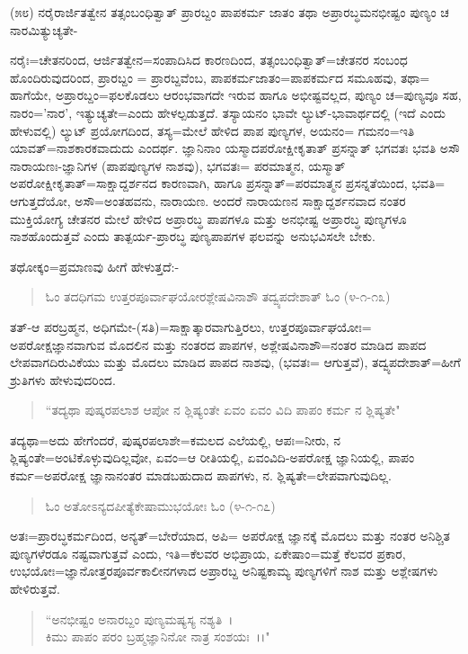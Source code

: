 (೫೮) ನರೈರಾರ್ಜಿತತ್ವೇನ ತತ್ಸಂಬಂಧಿತ್ವಾತ್ ಪ್ರಾರಬ್ದಂ ಪಾಪಕರ್ಮ ಜಾತಂ ತಥಾ ಅಪ್ರಾರಬ್ಧಮನಭೀಷ್ಟಂ ಪುಣ್ಯಂ ಚ ನಾರಮಿತ್ಯುಚ್ಯತೇ-

ನರೈಃ=ಚೇತನರಿಂದ, ಆರ್ಜಿತತ್ವೇನ=ಸಂಪಾದಿಸಿದ ಕಾರಣದಿಂದ, ತತ್ಸಂಬಂಧಿತ್ವಾತ್=ಚೇತನರ ಸಂಬಂಧ ಹೊಂದಿರುವುದರಿಂದ, ಪ್ರಾರಬ್ದಂ = ಪ್ರಾರಬ್ದವೆಂಬ, ಪಾಪಕರ್ಮಜಾತಂ=ಪಾಪಕರ್ಮದ ಸಮೂಹವು, ತಥಾ= ಹಾಗೆಯೇ, ಅಪ್ರಾರಬ್ದಂ=ಫಲಕೊಡಲು ಆರಂಭವಾಗದೇ ಇರುವ ಹಾಗೂ ಅಭೀಷ್ಟವಲ್ಲದ, ಪುಣ್ಯಂ ಚ=ಪುಣ್ಯವೂ ಸಹ, ನಾರಂ='ನಾರ', ಇತ್ಯುಚ್ಯತೇ=ಎಂದು ಹೇಳಲ್ಪಡುತ್ತದೆ. ತಸ್ಯಾಯನಂ ಭಾವೇ ಲ್ಯುಟ್-ಭಾವಾರ್ಥದಲ್ಲಿ (ಇದೆ ಎಂದು ಹೇಳುವಲ್ಲಿ) ಲ್ಯುಟ್ ಪ್ರಯೋಗದಿಂದ, ತಸ್ಯ=ಮೇಲೆ ಹೇಳಿದ ಪಾಪ ಪುಣ್ಯಗಳ, ಅಯನಂ= ಗಮನಂ=ಇತಿ ಯಾವತ್=ನಾಶಕಾರಕವಾದುದು ಎಂದರ್ಥ. ಜ್ಞಾನಿನಾಂ ಯಸ್ಮಾದಪರೋಕ್ಷೀಕೃತಾತ್ ಪ್ರಸನ್ನಾತ್ ಭಗವತಃ ಭವತಿ ಅಸೌ ನಾರಾಯಣಃ-ಜ್ಞಾನಿಗಳ (ಪಾಪಪುಣ್ಯಗಳ ನಾಶವು), ಭಗವತಃ= ಪರಮಾತ್ಮನ, ಯಸ್ಮಾತ್ ಅಪರೋಕ್ಷೀಕೃತಾತ್=ಸಾಕ್ಷಾದ್ದರ್ಶನದ ಕಾರಣವಾಗಿ, ಹಾಗೂ ಪ್ರಸನ್ನಾತ್=ಪರಮಾತ್ಮನ ಪ್ರಸನ್ನತೆಯಿಂದ, ಭವತಿ= ಆಗುತ್ತದೆಯೋ, ಅಸೌ=ಅಂತಹವನು, ನಾರಾಯಣ. ಅಂದರೆ ನಾರಾಯಣನ ಸಾಕ್ಷಾದ್ದರ್ಶನವಾದ ನಂತರ ಮುಕ್ತಿಯೋಗ್ಯ ಚೇತನರ ಮೇಲೆ ಹೇಳಿದ ಅಪ್ರಾರಬ್ಧ ಪಾಪಗಳೂ ಮತ್ತು ಅನಭೀಷ್ಟ ಅಪ್ರಾರಬ್ಧ ಪುಣ್ಯಗಳೂ ನಾಶಹೊಂದುತ್ತವೆ ಎಂದು ತಾತ್ಪರ್ಯ-ಪ್ರಾರಬ್ಧ ಪುಣ್ಯಪಾಪಗಳ ಫಲವನ್ನು ಅನುಭವಿಸಲೇ ಬೇಕು.

ತಥೋಕ್ಕಂ=ಪ್ರಮಾಣವು ಹೀಗೆ ಹೇಳುತ್ತದೆ:-

\begin{verse}
ಓಂ ತದಧಿಗಮ ಉತ್ತರಪೂರ್ವಾಘಯೋರಶ್ಲೇಷವಿನಾಶೌ‌ ತದ್ವ್ಯಪದೇಶಾತ್ ಓಂ (೪-೧-೧೩)
\end{verse}

ತತ್-ಆ ಪರಬ್ರಹ್ಮನ, ಅಧಿಗಮೇ-(ಸತಿ)=ಸಾಕ್ಷಾತ್ಕಾರವಾಗುತ್ತಿರಲು, ಉತ್ತರಪೂರ್ವಾಘಯೋಃ= ಅಪರೋಕ್ಷಜ್ಞಾನವಾಗುವ ಮೊದಲಿನ ಮತ್ತು ನಂತರದ ಪಾಪಗಳ, ಅಶ್ಲೇಷವಿನಾಶೌ=ನಂತರ ಮಾಡಿದ ಪಾಪದ ಲೇಪವಾಗದಿರುವಿಕೆಯು ಮತ್ತು ಮೊದಲು ಮಾಡಿದ ಪಾಪದ ನಾಶವು, (ಭವತಃ= ಆಗುತ್ತವೆ), ತದ್ವ್ಯಪದೇಶಾತ್=ಹೀಗೆ ಶ್ರುತಿಗಳು ಹೇಳುವುದರಿಂದ.

\begin{verse}
``ತದ್ಯಥಾ ಪುಷ್ಕರಪಲಾಶ ಆಪೋ ನ ಶ್ಲಿಷ್ಯಂತೇ ಏವಂ ಏವಂ ವಿದಿ ಪಾಪಂ ಕರ್ಮ ನ ಶ್ಲಿಷ್ಯತೇ"
\end{verse}

ತದ್ಯಥಾ=ಅದು ಹೇಗೆಂದರೆ, ಪುಷ್ಕರಪಲಾಶೇ=ಕಮಲದ ಎಲೆಯಲ್ಲಿ, ಆಪಃ=ನೀರು, ನ ಶ್ಲಿಷ್ಯಂತೇ=ಅಂಟಿಕೊಳ್ಳುವುದಿಲ್ಲವೋ, ಏವಂ=ಆ ರೀತಿಯಲ್ಲಿ, ಏವಂವಿದಿ-ಅಪರೋಕ್ಷ ಜ್ಞಾನಿಯಲ್ಲಿ, ಪಾಪಂ ಕರ್ಮ=ಅಪರೋಕ್ಷ ಜ್ಞಾನಾನಂತರ ಮಾಡಬಹುದಾದ ಪಾಪಗಳು, ನ. ಶ್ಲಿಷ್ಯತೇ=ಲೇಪವಾಗುವುದಿಲ್ಲ.

\begin{verse}
ಓಂ ಅತೋಽನ್ಯದಪೀತ್ಯೆಕೇಷಾಮುಭಯೋಃ ಓಂ (೪-೧-೧೭)
\end{verse}

ಅತಃ=ಪ್ರಾರಬ್ಧಕರ್ಮದಿಂದ, ಅನ್ಯತ್=ಬೇರೆಯಾದ, ಅಪಿ= ಅಪರೋಕ್ಷ ಜ್ಞಾನಕ್ಕೆ ಮೊದಲು ಮತ್ತು ನಂತರ ಅನಿಶ್ಚಿತ ಪುಣ್ಯಗಳೆರಡೂ ನಷ್ಟವಾಗುತ್ತವೆ ಎಂದು, ಇತಿ=ಕೆಲವರ ಅಭಿಪ್ರಾಯ, ಏಕೇಷಾಂ=ಮತ್ತೆ ಕೆಲವರ ಪ್ರಕಾರ, ಉಭಯೋಃ=ಜ್ಞಾನೋತ್ತರಪೂರ್ವಕಾಲೀನಗಳಾದ ಅಪ್ರಾರಬ್ದ ಅನಿಷ್ಟಕಾಮ್ಯ ಪುಣ್ಯಗಳಿಗೆ ನಾಶ ಮತ್ತು ಅಶ್ಲೇಷಗಳು ಹೇಳಿರುತ್ತವೆ.

\begin{verse}
``ಅನಭೀಷ್ಟಂ ಅನಾರಬ್ದಂ ಪುಣ್ಯಮಷ್ಯಸ್ಯ ನಶ್ಯತಿ~।\\ ಕಿಮು ಪಾಪಂ ಪರಂ ಬ್ರಹ್ಮಜ್ಞಾನಿನೋ ನಾತ್ರ ಸಂಶಯಃ~।।"
\end{verse}


